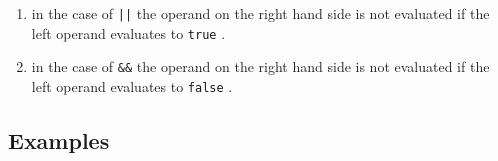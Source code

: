 \documentclass[a4paper,10pt]{scrreprt}
\newlength{\itemindentlen}
\begin{document}
\setlength{\itemindentlen}{\textwidth}
\begin{enumerate}
\addtolength{\itemindentlen}{-2em}

\item \begin{minipage}[t]{\itemindentlen}
in the case of \lstinline{||}
 the operand on the right hand side is not evaluated if the left operand evaluates to \lstinline{true}
.
\end{minipage}

\item \begin{minipage}[t]{\itemindentlen}
in the case of \lstinline{&&}
 the operand on the right hand side is not evaluated if the left operand evaluates to \lstinline{false}
.
\end{minipage}

\end{enumerate}
\addtolength{\itemindentlen}{2em}

 




\subsection{Examples}
\end{document}

